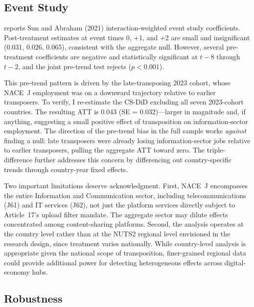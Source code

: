 \documentclass[12pt]{article}
\begin{document}


\subsection{Event Study}

 reports Sun and Abraham (2021) interaction-weighted event study coefficients. Post-treatment estimates at event times 0, +1, and +2 are small and insignificant (0.031, 0.026, 0.065), consistent with the aggregate null. However, several pre-treatment coefficients are negative and statistically significant at $t-8$ through $t-2$, and the joint pre-trend test rejects ($p < 0.001$).

This pre-trend pattern is driven by the late-transposing 2023 cohort, whose NACE~J employment was on a downward trajectory relative to earlier transposers. To verify, I re-estimate the CS-DiD excluding all seven 2023-cohort countries. The resulting ATT is 0.043 (SE = 0.032)---larger in magnitude and, if anything, suggesting a small positive effect of transposition on information-sector employment. The direction of the pre-trend bias in the full sample works \textit{against} finding a null: late transposers were already losing information-sector jobs relative to earlier transposers, pulling the aggregate ATT toward zero. The triple-difference further addresses this concern by differencing out country-specific trends through country-year fixed effects.

Two important limitations deserve acknowledgment. First, NACE~J encompasses the entire Information and Communication sector, including telecommunications (J61) and IT services (J62), not just the platform services directly subject to Article~17's upload filter mandate. The aggregate sector may dilute effects concentrated among content-sharing platforms. Second, the analysis operates at the country level rather than at the NUTS2 regional level envisioned in the research design, since treatment varies nationally. While country-level analysis is appropriate given the national scope of transposition, finer-grained regional data could provide additional power for detecting heterogeneous effects across digital-economy hubs.



\subsection{Robustness}
\end{document}

